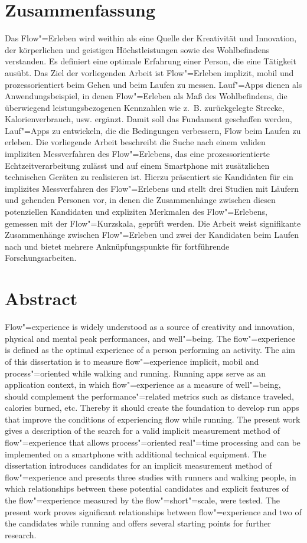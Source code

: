 

\section*{Zusammenfassung} Das Flow"=Erleben wird weithin als eine Quelle der Kreativität und Innovation, der körperlichen und geistigen Höchstleistungen sowie des Wohlbefindens verstanden. Es definiert eine optimale Erfahrung einer Person, die eine Tätigkeit ausübt. Das Ziel der vorliegenden Arbeit ist Flow"=Erleben implizit, mobil und prozessorientiert beim Gehen und beim Laufen zu messen. Lauf"=Apps dienen als Anwendungsbeispiel, in denen Flow"=Erleben als Maß des Wohlbefindens, die überwiegend leistungsbezogenen Kennzahlen wie z.~B. zurückgelegte Strecke, Kalorienverbrauch, usw. ergänzt. Damit soll das Fundament geschaffen werden, Lauf"=Apps zu entwickeln, die die Bedingungen verbessern, Flow beim Laufen zu erleben. Die vorliegende Arbeit beschreibt die Suche nach einem validen impliziten Messverfahren des Flow"=Erlebens, das eine prozessorientierte Echtzeitverarbeitung zulässt und auf einem Smartphone mit zusätzlichen technischen Geräten zu realisieren ist. Hierzu präsentiert sie Kandidaten für ein implizites Messverfahren des Flow"=Erlebens und stellt drei Studien mit Läufern und gehenden Personen vor, in denen die Zusammenhänge zwischen diesen potenziellen Kandidaten und expliziten Merkmalen des Flow"=Erlebens, gemessen mit der Flow"=Kurzskala, geprüft werden. Die Arbeit weist signifikante Zusammenhänge zwischen Flow"=Erleben und zwei der Kandidaten beim Laufen nach und bietet mehrere Anknüpfungspunkte für fortführende Forschungsarbeiten. 
\newpage

\section*{Abstract} Flow"=experience is widely understood as a source of creativity and innovation, physical and mental peak performances, and well"=being. The flow"=experience is defined as the optimal experience of a person performing an activity. The aim of this dissertation is to measure flow"=experience implicit, mobil and process"=oriented while walking and running. Running apps serve as an application context, in which flow"=experience as a measure of well"=being, should complement the performance"=related metrics such as distance traveled, calories burned, etc. Thereby it should create the foundation to develop run apps that improve the conditions of experiencing flow while running. The present work gives a description of the search for a valid implicit measurement method of flow"=experience that allows process"=oriented real"=time processing and can be implemented on a smartphone with additional technical equipment. The dissertation introduces candidates for an implicit measurement method of flow"=experience and presents three studies with runners and walking people, in which relationships between these potential candidates and explicit features of the flow"=experience measured by the flow"=short"=scale, were tested. The present work proves significant relationships between flow"=experience and two of the candidates while running and offers several starting points for further research. 
